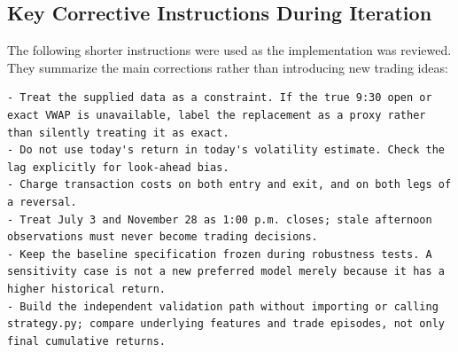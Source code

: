 \documentclass{article}
\begin{document}
\subsection{Key Corrective Instructions During Iteration}

The following shorter instructions were used as the implementation was reviewed. They summarize the main corrections rather than introducing new trading ideas:

\begin{lstlisting}
- Treat the supplied data as a constraint. If the true 9:30 open or exact VWAP is unavailable, label the replacement as a proxy rather than silently treating it as exact.
- Do not use today's return in today's volatility estimate. Check the lag explicitly for look-ahead bias.
- Charge transaction costs on both entry and exit, and on both legs of a reversal.
- Treat July 3 and November 28 as 1:00 p.m. closes; stale afternoon observations must never become trading decisions.
- Keep the baseline specification frozen during robustness tests. A sensitivity case is not a new preferred model merely because it has a higher historical return.
- Build the independent validation path without importing or calling strategy.py; compare underlying features and trade episodes, not only final cumulative returns.
\end{lstlisting}
\end{document}
